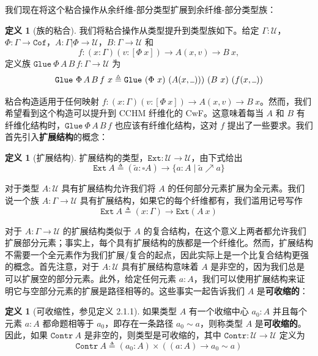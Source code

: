 \documentclass{ctexrep}
\theoremstyle{plain}
\theoremstyle{definition}
\newtheorem{definition}[theorem]{定义}
\theoremstyle{remark}
\newcommand{\ul}{{\rule[0ex]{0.5em}{0.4pt}}} %
\begin{document}
我们现在将这个粘合操作从余纤维-部分类型扩展到余纤维-部分类型族：

\begin{definition}[族的粘合]
我们将粘合操作从类型提升到类型族如下。给定 $\Gamma : \mathcal{U}$，$\Phi : \Gamma \to \mathtt{Cof}$，$A : \Gamma|\Phi \to \mathcal{U}$，$B : \Gamma \to \mathcal{U}$ 和
\[
f : (x : \Gamma)(v : [\Phi\ x]) \to A(x, v) \to B\ x,
\]
定义族 $\mathtt{Glue}\ \Phi\,A\,B\,f : \Gamma \to \mathcal{U}$ 为
\begin{equation}
\mathtt{Glue}\ \Phi\,A\,B\,f\ x \triangleq \mathtt{Glue}\ (\Phi\ x)\ (A(x, \ul )))\ (B\ x)\ (f(x, \ul ))
\end{equation}
\end{definition}

粘合构造适用于任何映射 $f : (x : \Gamma)(v : [\Phi\ x]) \to A(x, v) \to B\ x$。然而，我们希望看到这个构造可以提升到 CCHM 纤维化的 CwF。这意味着每当 $A$ 和 $B$ 有纤维化结构时，$\mathtt{Glue}\ \Phi\,A\,B\,f$ 也应该有纤维化结构，这对 $f$ 提出了一些要求。我们首先引入\textbf{扩展结构}的概念：

\begin{definition}[扩展结构]
扩展结构的类型，$\mathtt{Ext} : \mathcal{U} \to \mathcal{U}$，由下式给出
\[
\mathtt{Ext}\ A \triangleq (\tilde{a} : \square A) \to \{a : A \mid \tilde{a} \nearrow a\}
\]
\end{definition}

对于类型 $A : \mathcal{U}$ 具有扩展结构允许我们将 $A$ 的任何部分元素扩展为全元素。我们说一个族 $A : \Gamma \to \mathcal{U}$ 具有扩展结构，如果它的每个纤维都有，我们滥用记号写作
\[
\mathtt{Ext}\ A \triangleq (x : \Gamma) \to \mathtt{Ext}(A\ x)
\]

对于 $A : \Gamma \to \mathcal{U}$ 的扩展结构类似于 $A$ 的复合结构，在这个意义上两者都允许我们扩展部分元素；事实上，每个具有扩展结构的族都是一个纤维化。然而，扩展结构不需要一个全元素作为我们扩展/复合的起点，因此实际上是一个比复合结构更强的概念。首先注意，对于 $A : \mathcal{U}$ 具有扩展结构意味着 $A$ 是非空的，因为我们总是可以扩展空的部分元素。此外，给定任何元素 $a : A$，我们可以使用扩展结构来证明它与空部分元素的扩展是路径相等的。这些事实一起告诉我们 $A$ 是\textbf{可收缩的}：

\begin{definition}[可收缩性，参见定义 2.1.1]
如果类型 $A$ 有一个收缩中心 $a_0 : A$ 并且每个元素 $a : A$ 都命题相等于 $a_0$，即存在一条路径 $a_0 \sim a$，则称类型 $A$ 是\textbf{可收缩的}。因此，如果 $\mathtt{Contr}\ A$ 是非空的，则类型是可收缩的，其中 $\mathtt{Contr} : \mathcal{U} \to \mathcal{U}$ 定义为
\[
\mathtt{Contr}\ A \triangleq (a_0 : A) \times ((a : A) \to a_0 \sim a)
\]
\end{definition}
\end{document}
